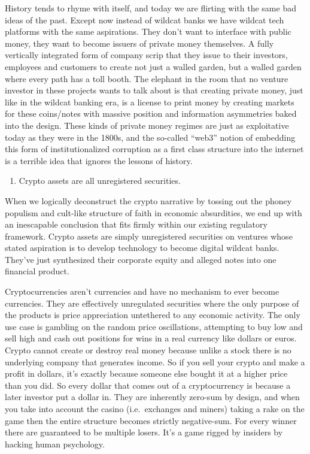 \documentclass[
]{book}
\providecommand{\tightlist}{%
  \setlength{\itemsep}{0pt}\setlength{\parskip}{0pt}}
\begin{document}
History tends to rhyme with itself, and today we are flirting with the same bad ideas of the past. Except now instead of wildcat banks we have wildcat tech platforms with the same aspirations. They don't want to interface with public money, they want to become issuers of private money themselves. A fully vertically integrated form of company scrip that they issue to their investors, employees and customers to create not just a walled garden, but a walled garden where every path has a toll booth. The elephant in the room that no venture investor in these projects wants to talk about is that creating private money, just like in the wildcat banking era, is a license to print money by creating markets for these coins/notes with massive position and information asymmetries baked into the design. These kinds of private money regimes are just as exploitative today as they were in the 1800s, and the so-called ``web3'' notion of embedding this form of institutionalized corruption as a first class structure into the internet is a terrible idea that ignores the lessons of history.

\begin{enumerate}
\def\labelenumi{\arabic{enumi}.}
\setcounter{enumi}{3}
\tightlist
\item
  Crypto assets are all unregistered securities.
\end{enumerate}

When we logically deconstruct the crypto narrative by tossing out the phoney populism and cult-like structure of faith in economic absurdities, we end up with an inescapable conclusion that fits firmly within our existing regulatory framework. Crypto assets are simply unregistered securities on ventures whose stated aspiration is to develop technology to become digital wildcat banks. They've just synthesized their corporate equity and alleged notes into one financial product.

Cryptocurrencies aren't currencies and have no mechanism to ever become currencies. They are effectively unregulated securities where the only purpose of the products is price appreciation untethered to any economic activity. The only use case is gambling on the random price oscillations, attempting to buy low and sell high and cash out positions for wins in a real currency like dollars or euros. Crypto cannot create or destroy real money because unlike a stock there is no underlying company that generates income. So if you sell your crypto and make a profit in dollars, it's exactly because someone else bought it at a higher price than you did. So every dollar that comes out of a cryptocurrency is because a later investor put a dollar in. They are inherently zero-sum by design, and when you take into account the casino (i.e.~exchanges and miners) taking a rake on the game then the entire structure becomes strictly negative-sum. For every winner there are guaranteed to be multiple losers. It's a game rigged by insiders by hacking human psychology.
\end{document}
